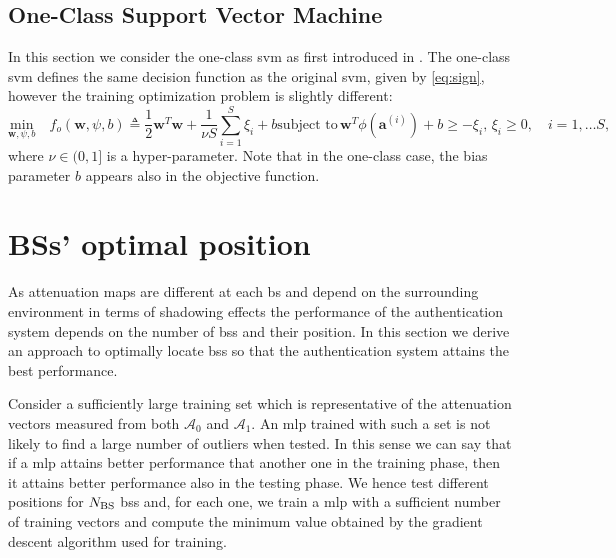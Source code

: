 \documentclass[draftcls,onecolumn,12pt]{IEEEtran}
\begin{document}
\subsection{One-Class Support Vector Machine}
In this section we consider the one-class \ac{svm} as first introduced in \cite{Scholkopf2001estimating}. The one-class \ac{svm} defines the same decision function as the original \ac{svm}, given by \eqref{eq:sign}, however the training optimization problem is slightly different:
\begin{subequations}
	\label{eq:oneClassSvm}
	\begin{equation}
	\label{eq:oneClass1}
	\underset{\mathbf{w},\psi, b}{\text{min}} \quad f_o(\mathbf{w},\psi, b) \triangleq
	 \frac{1}{2} \mathbf{w}^T \mathbf{w} +  \frac{1}{\nu S} \sum_{i=1}^S \xi_i + b 
	\end{equation}
	\begin{equation}
	\label{eq:oneClassConstr}
	\text{subject to}\, \mathbf{w}^T \phi (\mathbf{a}^{(i)}) + b \geq - \xi_i, \, \xi_i \geq 0,  \quad i = 1,\dots S, 
	\end{equation}
\end{subequations}
where $\nu \in (0,1]$ is a hyper-parameter.
Note that in the one-class case, the bias parameter $b$ appears also in the objective function.


\section{BSs' optimal position}\label{sec:bsPos}
As attenuation maps are different at each \ac{bs} and depend on the surrounding environment in terms of shadowing effects the performance of the authentication system depends on the number of \acp{bs} and their position. In this section we derive an approach to optimally locate \acp{bs} so that the authentication system attains the best performance. 

Consider a sufficiently large training set which is representative of the attenuation vectors measured from both $\mathcal{A}_0$ and $\mathcal{A}_1$. An \ac{mlp} trained with such a set is not likely to find a large number of outliers when tested. In this sense we can say that if a \ac{mlp} attains better performance that another one in the training phase, then it attains better performance also in the testing phase. We hence test different positions for $N_{\rm BS}$ \acp{bs} and, for each one, we train a \ac{mlp} with a sufficient number of training vectors and compute the minimum value obtained by the gradient descent algorithm used for training.
\end{document}
